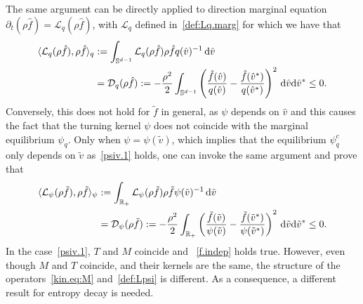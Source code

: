 \documentclass[a4paper]{article}
\theoremstyle{Theorem}\newtheorem{proposition}{Proposition}[section]
\theoremstyle{Remark}\newtheorem{remark}{Remark}[section]
\theoremstyle{Theorem}\newtheorem{theorem}{Theorem}[section]
\DeclarePairedDelimiter\ave{\langle}{\rangle}
\newcommand{\R}{\mathbb{R}}
\newcommand{\hv}{\hat{v}}
\newcommand{\tv}{\tilde{v}}
\newcommand{\hf}{\hat{f}}
\newcommand{\tf}{\tilde{f}}
\newcommand{\intS}{\int_{\mathbb{S}^{d-1}}}
\newcommand{\intR}{\int_{\R_+}}
\begin{document}
 The same argument can be directly applied to direction marginal equation $\partial_t (\rho\hf)= \mathcal{L}_q(\rho \hf)$, with $\mathcal{L}_q$ defined in~\eqref{def:Lq.marg} for which we have that
\begin{equation*}
\begin{split}
\ave{\mathcal{L}_q(\rho \hf),\rho \hf}_q &:= \intS \mathcal{L}_q(\rho \hf) \rho \hf q(\hv)^{-1} \, {\rm d} \hv \\
&= \mathcal{D}_q(\rho \hf) := -\dfrac{\rho^2}{2}\intS \left(\dfrac{\hf(\hv)}{q(\hv)}-\dfrac{\hf(\hv^*)}{q(\hv^*)}\right)^2 \, {\rm d}\hv {\rm d}\hv^* \le 0.
\end{split}
\end{equation*}
Conversely, this does not hold for $\tf$ in general, as $\psi$ depends on $\hv$ and this causes the fact that the turning kernel $\psi$ does not coincide with the marginal equilibrium $\psi_q$. Only when $\psi=\psi(\tv)$, which implies that the equilibrium $\psi_q^c$ only depends on $\tv$ as~\eqref{psiv.1} holds, one can invoke the same argument and prove that
\begin{equation*}
\begin{split}
\ave{\mathcal{L}_\psi(\rho \tf),\rho \tf}_\psi &:= \intR \mathcal{L}_\psi(\rho \tf) \rho \tf \psi(\tv)^{-1} \, {\rm d} \tv \\
&= \mathcal{D}_\psi(\rho \tf) := -\dfrac{\rho^2}{2}\intR \left(\dfrac{\tf(\tv)}{\psi(\tv)}-\dfrac{\tf(\tv^*)}{\psi(\tv^*)}\right)^2 \, {\rm d}\tv {\rm d}\tv^* \le 0.
\end{split}
\end{equation*}
In the case~\eqref{psiv.1}, $T$ and $M$ coincide and ~\eqref{f.indep} holds true. However, even though $M$ and $T$ coincide, and their kernels are the same, the structure of the operators~\eqref{kin.eq:M} and~\eqref{def:Lpsi} is different. As a consequence, a different result for entropy decay is needed.
\end{document}
